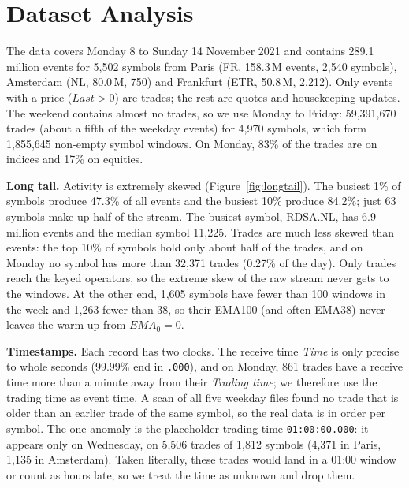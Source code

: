 \documentclass[sigconf]{acmart}
\begin{document}
\section{Dataset Analysis}\label{sec:data}
The data covers Monday 8 to Sunday 14 November 2021 and contains 289.1 million events for 5,502 symbols from Paris (FR, 158.3\,M events, 2,540 symbols), Amsterdam (NL, 80.0\,M, 750) and Frankfurt (ETR, 50.8\,M, 2,212). Only events with a price ($\mathit{Last}>0$) are trades; the rest are quotes and housekeeping updates. The weekend contains almost no trades, so we use Monday to Friday: 59,391,670 trades (about a fifth of the weekday events) for 4,970 symbols, which form 1,855,645 non-empty symbol windows. On Monday, 83\% of the trades are on indices and 17\% on equities.

\textbf{Long tail.} Activity is extremely skewed (Figure~\ref{fig:longtail}). The busiest 1\% of symbols produce 47.3\% of all events and the busiest 10\% produce 84.2\%; just 63 symbols make up half of the stream. The busiest symbol, RDSA.NL, has 6.9 million events and the median symbol 11,225. Trades are much less skewed than events: the top 10\% of symbols hold only about half of the trades, and on Monday no symbol has more than 32,371 trades (0.27\% of the day). Only trades reach the keyed operators, so the extreme skew of the raw stream never gets to the windows. At the other end, 1,605 symbols have fewer than 100 windows in the week and 1,263 fewer than 38, so their EMA100 (and often EMA38) never leaves the warm-up from $\mathit{EMA}_0=0$.

\textbf{Timestamps.} Each record has two clocks. The receive time \textit{Time} is only precise to whole seconds (99.99\% end in \texttt{.000}), and on Monday, 861 trades have a receive time more than a minute away from their \textit{Trading time}; we therefore use the trading time as event time. A scan of all five weekday files found no trade that is older than an earlier trade of the same symbol, so the real data is in order per symbol. The one anomaly is the placeholder trading time \texttt{01:00:00.000}: it appears only on Wednesday, on 5,506 trades of 1,812 symbols (4,371 in Paris, 1,135 in Amsterdam). Taken literally, these trades would land in a 01:00 window or count as hours late, so we treat the time as unknown and drop them.
\end{document}
